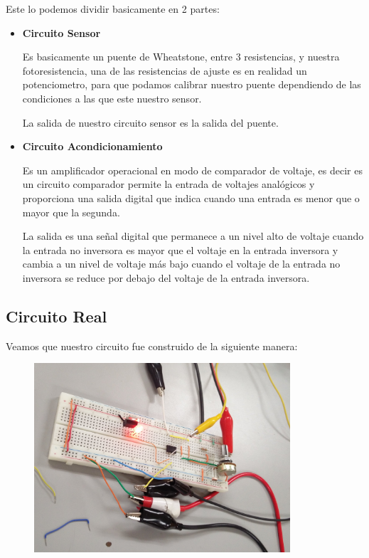 \documentclass[12pt, fleqn]{article}                            %
\theoremstyle{break}                                            %
\begin{document}
        Este lo podemos dividir basicamente en 2 partes:
        \begin{itemize}
            \item 
                \textbf{Circuito Sensor}

                Es basicamente un puente de Wheatstone, entre 3 resistencias, y nuestra fotoresistencia,
                una de las resistencias de ajuste es en realidad un potenciometro, para que podamos calibrar
                nuestro puente dependiendo de las condiciones a las que este nuestro sensor.

                La salida de nuestro circuito sensor es la salida del puente.
            \item 
                \textbf{Circuito Acondicionamiento}

                Es un amplificador operacional en modo de comparador de voltaje, es decir
                es un circuito comparador permite la entrada de voltajes analógicos y proporciona una salida digital
                que indica cuando una entrada es menor que o mayor que la segunda. 

                La salida es una señal digital que permanece a un nivel alto de voltaje cuando la entrada no inversora es
                mayor que el voltaje en la entrada inversora y cambia a un nivel de voltaje más bajo cuando el voltaje
                de la entrada no inversora se reduce por debajo del voltaje de la entrada inversora.

        \end{itemize}


    \clearpage
    \subsection{Circuito Real}

        Veamos que nuestro circuito fue construido de la siguiente manera:
        \begin{figure}[h]
            \centering
            \includegraphics[width=0.85\textwidth]{CircuitoGeneral1}
        \end{figure}
\end{document}
